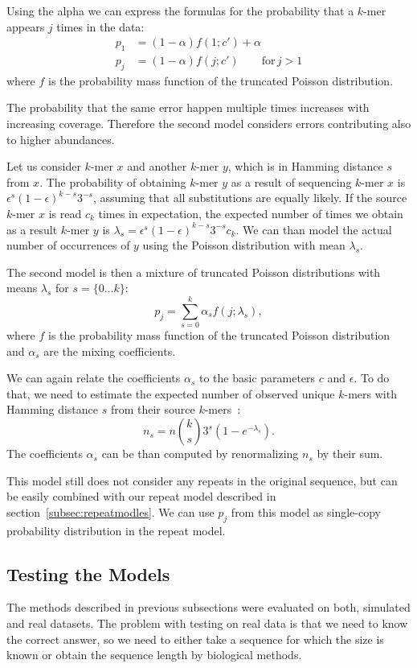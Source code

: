 Using the alpha we can express the formulas for the probability that a $k$-mer appears $j$ times in the data:
\begin{align*}
p_1 &= (1-\alpha) f(1; c') + \alpha \\
p_j &= (1-\alpha) f(j; c') \qquad\text{for}\, j>1
\end{align*}
where $f$ is the probability mass function of the truncated Poisson
distribution.

The probability that the same error happen multiple times increases with increasing coverage. Therefore the second model considers errors contributing also to higher abundances.

Let us consider $k$-mer $x$ and another $k$-mer $y$,
which is in Hamming distance $s$ from $x$. The probability of
obtaining $k$-mer $y$ as a result of sequencing $k$-mer $x$ is
$\epsilon^s {(1-\epsilon)}^{k-s} 3^{-s}$, assuming that all
substitutions are equally likely. If the source $k$-mer $x$ is read
$c_k$ times in expectation, the expected number of times we obtain as
a result $k$-mer $y$ is $\lambda_s = \epsilon^s {(1-\epsilon)}^{k-s}
3^{-s} c_k$. We can than model the actual number of occurrences of $y$ using the Poisson distribution with mean $\lambda_s$.

The second model is then a mixture of truncated Poisson distributions with means $\lambda_s$ for $s = \{0\dots k\}$:
$$p_j = \sum_{s=0}^k \alpha_s f(j; \lambda_s),$$
where $f$ is the probability mass function of the truncated Poisson
distribution and $\alpha_s$ are the mixing coefficients.

We can again relate the coefficients $\alpha_s$ to the basic parameters $c$ and $\epsilon$. To do that, we need to estimate the expected number of observed unique $k$-mers with Hamming distance $s$ from their source $k$-mers~\cite{covest}:
$$n_s = n {k \choose s} 3^s (1- e^{-\lambda_s}).$$
The coefficients $\alpha_s$ can be than computed by renormalizing $n_s$ by their sum.

This model still does not consider any repeats in the original sequence, but can be easily combined with our repeat model described in section~\ref{subsec:repeatmodles}. We can use $p_j$ from this model as single-copy probability distribution in the repeat model.

\subsection{Testing the Models}
The methods described in previous subsections were evaluated on both, simulated and real datasets. The problem with testing on real data is that we need to know the correct answer, so we need to either take a sequence for which the size is known or obtain the sequence length by biological methods.

